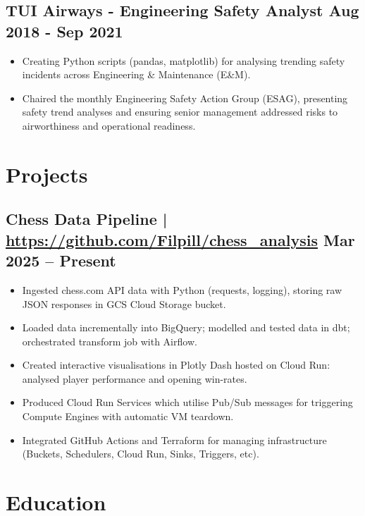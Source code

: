 \documentclass[a4paper, 10pt]{article}
\begin{document}
\subsection*{\textbf{TUI Airways - Engineering Safety Analyst} \hfill  Aug 2018 - Sep 2021}
\begin{itemize}[noitemsep]
  \item Creating Python scripts (pandas, matplotlib) for analysing trending safety incidents across Engineering \& Maintenance (E\&M).
  \item Chaired the monthly Engineering Safety Action Group (ESAG), presenting safety trend analyses and ensuring senior management addressed risks to airworthiness and operational readiness.
\end{itemize}
\vspace{-4.5mm}

\section*{Projects}
\vspace{-2.5mm}

\subsection*{\textbf{Chess Data Pipeline} | \url{https://github.com/Filpill/chess_analysis} \hfill  Mar 2025 – Present}
\begin{itemize}[noitemsep]
  \item Ingested chess.com API data with Python (requests, logging), storing raw JSON responses in GCS Cloud Storage bucket.
  \item Loaded data incrementally into BigQuery; modelled and tested data in dbt; orchestrated transform job with Airflow.
  \item Created interactive visualisations in Plotly Dash hosted on Cloud Run: analysed player performance and opening win-rates.
  \item Produced Cloud Run Services which utilise Pub/Sub messages for triggering Compute Engines with automatic VM teardown.
  \item Integrated GitHub Actions and Terraform for managing infrastructure (Buckets, Schedulers, Cloud Run, Sinks, Triggers, etc).
\end{itemize}
\vspace{-4.5mm}

\section*{Education}
\vspace{-3.5mm}
\end{document}
